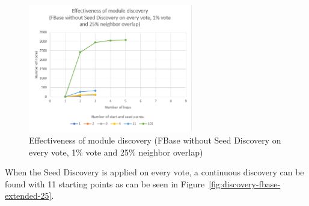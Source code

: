 \begin{figure}[ht!]
	\centering
	\includegraphics[width=0.64\textwidth]{images/discovery-fbase-simple-25.png}
	\caption{\label{fig:discovery-fbase-simple-25} Effectiveness of module discovery (FBase without Seed Discovery on every vote, 1\% vote and 25\% neighbor overlap)}
\end{figure}


\newpage

When the Seed Discovery is applied on every vote, a continuous discovery can be found with 11 starting points as can be seen in Figure~\ref{fig:discovery-fbase-extended-25}.

